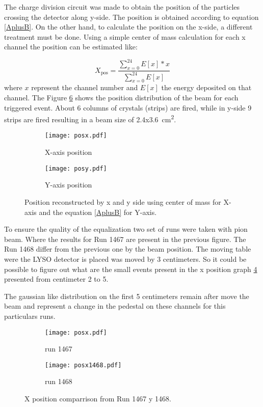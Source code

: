 The charge division circuit was made to obtain the position of the particles crossing the detector along y-side. The
position is obtained according to equation \ref{AplusB}. On the other hand, to calculate the position on the x-side, a
different treatment must be done. Using a simple center of mass calculation for each x channel the position can be
estimated like:

\begin{equation}
X_{\mathrm{pos}}=\frac{\sum_{x=0}^{24} E[x]*x}{\sum_{x=0}^{24} E[x]}
\end{equation}
where $x$ represent the channel number and $E[x]$ the energy deposited on that channel. The Figure \ref{position} shows
the position distribution of the beam for each triggered event. About 6 columns of crystals (strips) are fired, while in
y-side 9 strips are fired resulting in a beam size of 2.4x3.6\SI{}{cm^2}.  

\begin{figure}[ht]
	\hspace*{\fill}
	\centering
		\begin{subfigure}[b]{0.45\textwidth}
			\texttt{[image: posx.pdf]}
			\caption{X-axis position}\label{xpos}
		\end{subfigure}
		\hfill
		\begin{subfigure}[b]{0.45\textwidth}
			\texttt{[image: posy.pdf]}
			\caption{Y-axis position}\label{}
		\end{subfigure}
\hspace*{\fill}
	\caption{Position reconstructed by x and y side using center of mass for X-axis and the equation \ref{AplusB} for
	Y-axis.}\label{position}
\end{figure}
To ensure the quality of the equalization two set of runs were taken with pion beam. Where the results for Run 1467 are
present in the previous figure. The Run 1468 differ from the previous one by the beam position. The moving table were
the LYSO detector is placed was moved by 3 centimeters. So it could be possible to figure out what are the small events
present in the x position graph \ref{xpos} presented from centimeter 2 to 5. \par

The gaussian like distribution on the first 5 centimeters remain after move the beam and represent a change in the
pedestal on these channels for this particulars runs.\par
\begin{figure}[ht]
	\hspace*{\fill}
	\centering
		\begin{subfigure}[b]{0.45\textwidth}
			\texttt{[image: posx.pdf]}
			\caption{run 1467}\label{xpos}
		\end{subfigure}
		\hfill
		\begin{subfigure}[b]{0.45\textwidth}
			\texttt{[image: posx1468.pdf]}
			\caption{run 1468}\label{}
		\end{subfigure}
\hspace*{\fill}
	\caption{X position comparrison from Run 1467 y 1468.}\label{position}
\end{figure}

